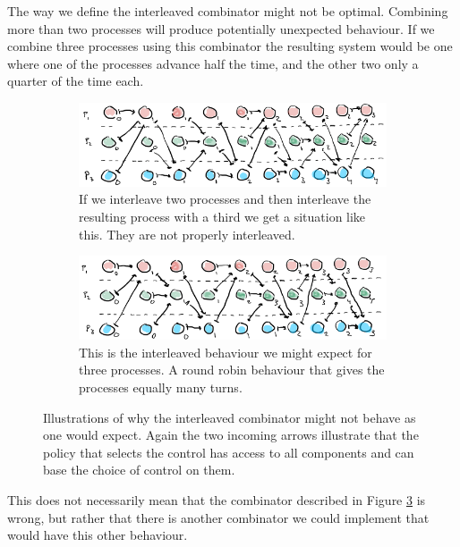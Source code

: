 \documentclass[sigplan,review]{acmart}\settopmatter{printfolios=true,printccs=false,printacmref=false}
\begin{document}
The way we define the interleaved combinator might not be optimal.
%
Combining more than two processes will produce potentially unexpected behaviour.
%
If we combine three processes using this combinator the resulting system would be one where one of the processes advance half the time, and the other two only a quarter of the time each.
%
\begin{figure}[htbp]
  \begin{subfigure}[b]{.8\textwidth}
    \centering
    \includegraphics[scale=0.8]{images/badinterleave2.png}
    \caption{If we interleave two processes and then interleave the resulting process with a third we get a situation like this. They are not properly interleaved.}
    \label{images:badinterleave}
  \end{subfigure}
  \begin{subfigure}[b]{.8\textwidth}
    \centering
    \includegraphics[scale=0.8]{images/wantedinterleave2.png}
    \caption{This is the interleaved behaviour we might expect for three processes. A round robin behaviour that gives the processes equally many turns.}
    \label{images:wantedinterleave}
  \end{subfigure}
  \caption{Illustrations of why the interleaved combinator might not behave as one would expect. Again the two incoming arrows illustrate that the policy that selects the control has access to all components and can base the choice of control on them.}
  \label{images:badvsgoodinterleave}
\end{figure}

%
This does not necessarily mean that the combinator described in Figure \ref{images:badvsgoodinterleave}  is wrong, but rather that there is another combinator we could implement that would have this other behaviour.
%
\end{document}
